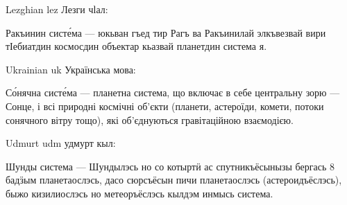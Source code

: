 \documentclass{article}
\begin{document}
\begin{xuchare}
Lezghian lez Лезги чӏал:

Ракъинин систе́ма — юкьван гъед тир Рагъ ва Ракъинилай элкъвезвай вири тӀебиатдин космосдин объектар кьазвай планетдин система я.

Ukrainian uk Українська мова:

Со́нячна систе́ма — планетна система, що включає в себе центральну зорю — Сонце, і всі природні космічні об'єкти (планети, астероїди, комети, потоки сонячного вітру тощо), які об'єднуються гравітаційною взаємодією.

Udmurt udm удмурт кыл:

Шунды система — Шундылэсь но со котыртӥ ас спутникъёсынызы бергась 8 бадӟым планетаослэсь, дасо сюрсъёсын пичи планетаослэсь (астероидъёслэсь), быжо кизилиослэсь но метеоръёслэсь кылдэм инмысь система.



\end{xuchare}
\end{document}
